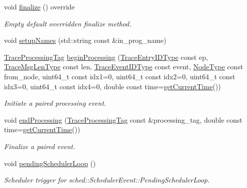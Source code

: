 \begin{DoxyCompactItemize}
void \hyperlink{structvt_1_1trace_1_1_trace_a571333fa708843b1b24079eccfc3ba93}{finalize} () override
\begin{DoxyCompactList}\small\item\em Empty default overridden finalize method. \end{DoxyCompactList}\item 
void \hyperlink{structvt_1_1trace_1_1_trace_a52cc4e12a7159cf21d8893b961834af8}{setup\+Names} (std\+::string const \&in\+\_\+prog\+\_\+name)
\item 
\hyperlink{structvt_1_1trace_1_1_trace_processing_tag}{Trace\+Processing\+Tag} \hyperlink{structvt_1_1trace_1_1_trace_a8f1a745228757b9d2ece4cd226d9540c}{begin\+Processing} (\hyperlink{namespacevt_1_1trace_a3c14050715ba9eceaeff51fb3de64f2f}{Trace\+Entry\+I\+D\+Type} const ep, \hyperlink{namespacevt_1_1trace_aeb598f45d67d41db7902e494f2f0ce59}{Trace\+Msg\+Len\+Type} const len, \hyperlink{namespacevt_1_1trace_a64a7185f3e102df8d8258f263ccd1582}{Trace\+Event\+I\+D\+Type} const event, \hyperlink{namespacevt_a866da9d0efc19c0a1ce79e9e492f47e2}{Node\+Type} const from\+\_\+node, uint64\+\_\+t const idx1=0, uint64\+\_\+t const idx2=0, uint64\+\_\+t const idx3=0, uint64\+\_\+t const idx4=0, double const time=\hyperlink{structvt_1_1trace_1_1_trace_a04cf6b76b4ced1bc90d246a34c948db5}{get\+Current\+Time}())
\begin{DoxyCompactList}\small\item\em Initiate a paired processing event. \end{DoxyCompactList}\item 
void \hyperlink{structvt_1_1trace_1_1_trace_a18f66e844acc133fce37c2c9d9f939e0}{end\+Processing} (\hyperlink{structvt_1_1trace_1_1_trace_processing_tag}{Trace\+Processing\+Tag} const \&processing\+\_\+tag, double const time=\hyperlink{structvt_1_1trace_1_1_trace_a04cf6b76b4ced1bc90d246a34c948db5}{get\+Current\+Time}())
\begin{DoxyCompactList}\small\item\em Finalize a paired event. \end{DoxyCompactList}\item 
void \hyperlink{structvt_1_1trace_1_1_trace_a5552347220b63160248f1ff5f14845f3}{pending\+Scheduler\+Loop} ()
\begin{DoxyCompactList}\small\item\em Scheduler trigger for {\ttfamily sched\+::\+Scheduler\+Event\+::\+Pending\+Scheduler\+Loop}. \end{DoxyCompactList}\item 

\end{DoxyCompactItemize}
